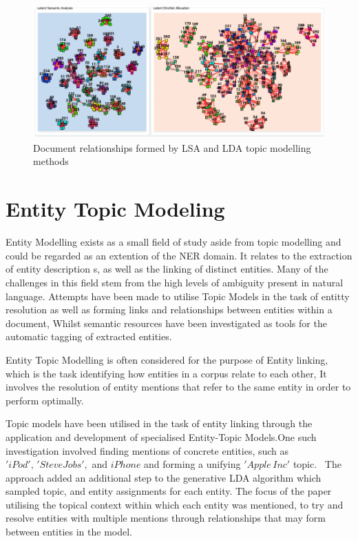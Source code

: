\documentclass[10pt]{report}
\begin{document}
\begin{figure}
  \centering
  \includegraphics[scale=0.45]{lda_lsa_document_view}
  \caption{Document relationships formed by LSA and LDA topic modelling methods\label{fig:lsa_lda_compare}}
\end{figure}

\section{Entity Topic Modeling}
Entity Modelling exists as a small field of study aside from topic modelling and could be regarded as an extention of the NER domain. It relates to the extraction of entity description s, as well as the linking of distinct entities. Many of the challenges in this field stem from the high levels of ambiguity present in natural language. Attempts have been made to utilise Topic Models in the task of entitty resolution as well as forming links and relationships between entities within a document, Whilst semantic resources have been investigated as tools for the automatic tagging of extracted entities.

Entity Topic Modelling is often considered for the purpose of Entity linking, which is the task identifying how entities in a corpus relate to each other, It involves the resolution of entity mentions that refer to the same entity in order to perform optimally.

Topic models have been utilised in the task of entity linking through the application and development of specialised Entity-Topic Models.One such investigation involved finding mentions of concrete entities, such as \('iPod',\, 'Steve Jobs',\) and \(iPhone\) and forming a unifying \('Apple\, Inc'\) topic.~\cite{Han2012-gy} The approach added an additional step to the generative LDA algorithm which sampled topic, and entity assignments for each entity. The focus of the paper utilising the topical context within which each entity was mentioned, to try and resolve entities with multiple mentions through relationships that may form between entities in the model.
\end{document}
